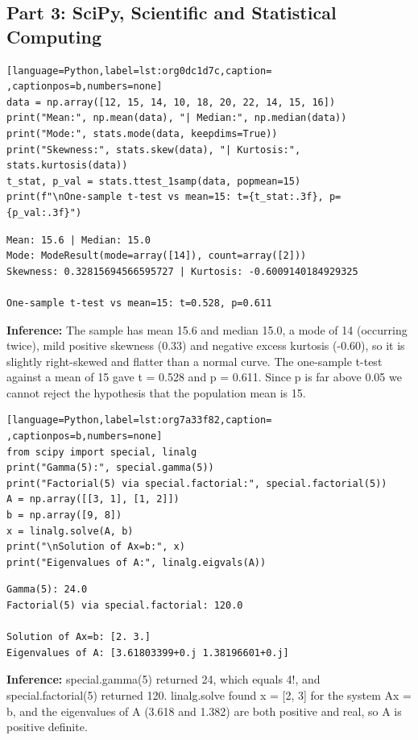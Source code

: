 \documentclass[11pt]{article}
\begin{document}
\subsection*{Part 3: SciPy, Scientific and Statistical Computing}
\label{sec:org5bd7b93}

\begin{lstlisting}[language=Python,label=lst:org0dc1d7c,caption= ,captionpos=b,numbers=none]
data = np.array([12, 15, 14, 10, 18, 20, 22, 14, 15, 16])
print("Mean:", np.mean(data), "| Median:", np.median(data))
print("Mode:", stats.mode(data, keepdims=True))
print("Skewness:", stats.skew(data), "| Kurtosis:", stats.kurtosis(data))
t_stat, p_val = stats.ttest_1samp(data, popmean=15)
print(f"\nOne-sample t-test vs mean=15: t={t_stat:.3f}, p={p_val:.3f}")
\end{lstlisting}

\begin{verbatim}
Mean: 15.6 | Median: 15.0
Mode: ModeResult(mode=array([14]), count=array([2]))
Skewness: 0.32815694566595727 | Kurtosis: -0.6009140184929325

One-sample t-test vs mean=15: t=0.528, p=0.611
\end{verbatim}


\textbf{Inference:} The sample has mean 15.6 and median 15.0, a mode of 14 (occurring twice), mild positive
skewness (0.33) and negative excess kurtosis (-0.60), so it is slightly right-skewed and
flatter than a normal curve. The one-sample t-test against a mean of 15 gave t = 0.528 and p
= 0.611. Since p is far above 0.05 we cannot reject the hypothesis that the population mean
is 15.
\begin{lstlisting}[language=Python,label=lst:org7a33f82,caption= ,captionpos=b,numbers=none]
from scipy import special, linalg
print("Gamma(5):", special.gamma(5))
print("Factorial(5) via special.factorial:", special.factorial(5))
A = np.array([[3, 1], [1, 2]])
b = np.array([9, 8])
x = linalg.solve(A, b)
print("\nSolution of Ax=b:", x)
print("Eigenvalues of A:", linalg.eigvals(A))
\end{lstlisting}

\begin{verbatim}
Gamma(5): 24.0
Factorial(5) via special.factorial: 120.0

Solution of Ax=b: [2. 3.]
Eigenvalues of A: [3.61803399+0.j 1.38196601+0.j]
\end{verbatim}


\textbf{Inference:} special.gamma(5) returned 24, which equals 4!, and special.factorial(5) returned 120.
linalg.solve found x = [2, 3] for the system Ax = b, and the eigenvalues of A (3.618 and
1.382) are both positive and real, so A is positive definite.
\end{document}
